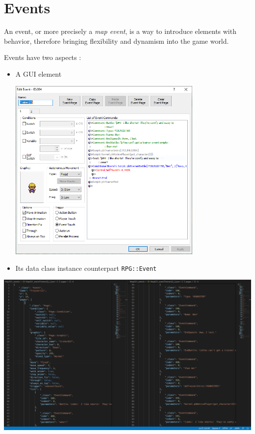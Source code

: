 \documentclass[11pt]{article}
\begin{document}
\newpage
\section{Events}

An event, or more precisely a \textit{map event}, is a way to introduce elements with behavior, therefore bringing flexibility and dynamism into the game world.

Events have two aspects :
\begin{itemize}
	\item A GUI element
	\vspace{2mm}
	\begin{center}
		\includegraphics[width=0.75\textwidth]{Event} 
	\end{center}
	\newpage
	\item Its data class instance counterpart \verb|RPG::Event|
	
	
\end{itemize}
\includegraphics[width=\textwidth]{Event_json}
\end{document}
